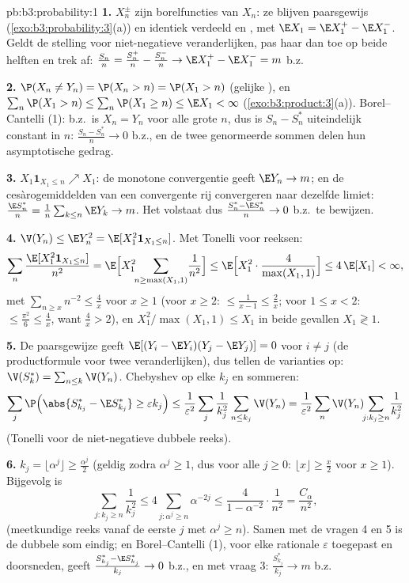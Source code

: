 \begin{solution}{pb:b3:probability:1}
\textbf{1.} $X_n^{\pm}$ zijn borelfuncties van $X_n$: ze blijven
paarsgewijs  (\cref{exo:b3:probability:3}(a)) en
identiek verdeeld en , met $\E X_1 = \E X_1^+ - \E
X_1^-$. Geldt de stelling voor niet-negatieve veranderlijken, pas
haar dan toe op beide helften en trek af: $\frac{S_n}n =
\frac{S_n^+}n - \frac{S_n^-}n \to \E X_1^+ - \E X_1^- = m$ b.z.

\textbf{2.} $\P(X_n \neq Y_n) = \P(X_n > n) = \P(X_1 > n)$
(gelijke ), en $\sum_n\P(X_1 > n) \leq \sum_n\P(X_1
\geq n) \leq \E X_1 < \infty$
(\cref{exo:b3:product:3}(a)). Borel--Cantelli (1): b.z.\ is $X_n
= Y_n$ voor alle grote $n$, dus is $S_n - S_n^*$ uiteindelijk
constant in $n$: $\frac{S_n - S_n^*}n \to 0$ b.z., en de twee
genormeerde sommen delen hun asymptotische gedrag.

\textbf{3.} $X_1\mathbf 1_{X_1 \leq n} \nearrow X_1$: de monotone
convergentie geeft $\E Y_n \to m$; en de cesàrogemiddelden van
een convergente rij convergeren naar dezelfde limiet: $\frac{\E
S_n^*}n = \frac1n\sum_{k\leq n}\E Y_k \to m$. Het volstaat dus
$\frac{S^*_n - \E S^*_n}{n} \to 0$ b.z.\ te bewijzen.

\textbf{4.} $\V(Y_n) \leq \E Y_n^2 = \E[X_1^2\mathbf 1_{X_1\leq
n}]$. Met Tonelli voor reeksen:
\[
\sum_n\frac{\E[X_1^2\mathbf 1_{X_1\leq n}]}{n^2}
= \E\Bigl[X_1^2\!\!\sum_{n \geq \max(X_1, 1)}\!\frac1{n^2}
\Bigr]
\leq \E\Bigl[X_1^2\cdot\frac{4}{\max(X_1,1)}\Bigr]
\leq 4\,\E[X_1] < \infty,
\]
met $\sum_{n\geq x}n^{-2} \leq \frac4x$ voor $x \geq 1$ (voor $x
\geq 2$: $\leq \frac1{x-1} \leq \frac2x$; voor $1 \leq x < 2$:
$\leq \frac{\pi^2}6 \leq \frac4x$, want $\frac4x > 2$), en
$X_1^2/\max(X_1, 1) \leq X_1$ in beide gevallen $X_1 \gtrless 1$.

\textbf{5.} De paarsgewijze  geeft $\E[(Y_i - \E
Y_i)(Y_j - \E Y_j)] = 0$ voor $i \neq j$ (de productformule voor
twee veranderlijken), dus tellen de varianties op: $\V(S^*_k) =
\sum_{n\leq k}\V(Y_n)$. Chebyshev op elke $k_j$ en sommeren:
\[
\sum_j\P\Bigl(\abs{S^*_{k_j} - \E S^*_{k_j}} \geq
\varepsilon k_j\Bigr)
\leq \frac1{\varepsilon^2}\sum_j\frac1{k_j^2}\sum_{n\leq
k_j}\V(Y_n)
= \frac1{\varepsilon^2}\sum_n\V(Y_n)\!\!\sum_{j : k_j\geq
n}\!\frac1{k_j^2}
\]
(Tonelli voor de niet-negatieve dubbele reeks).

\textbf{6.} $k_j = \lfloor\alpha^j\rfloor \geq \frac{\alpha^j}2$
(geldig zodra $\alpha^j \geq 1$, dus voor alle $j \geq 0$: $\lfloor
x\rfloor \geq \frac x2$ voor $x \geq 1$). Bijgevolg is
\[
\sum_{j : k_j \geq n}\frac1{k_j^2}
\leq 4\sum_{j : \alpha^j \geq n}\alpha^{-2j}
\leq \frac{4}{1 - \alpha^{-2}}\cdot\frac1{n^2}
= \frac{C_\alpha}{n^2},
\]
(meetkundige reeks vanaf de eerste $j$ met $\alpha^j \geq n$).
Samen met de vragen 4 en 5 is de dubbele som eindig; en
Borel--Cantelli (1), voor elke rationale $\varepsilon$ toegepast
en doorsneden, geeft $\frac{S^*_{k_j} - \E S^*_{k_j}}{k_j} \to 0$
b.z., en met vraag 3: $\frac{S^*_{k_j}}{k_j} \to m$ b.z.


\end{solution}
